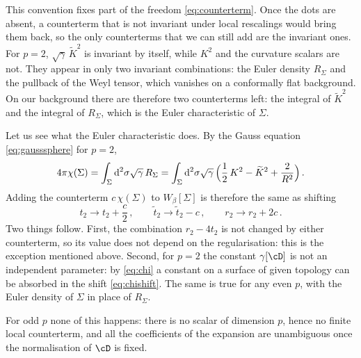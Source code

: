 \documentclass[a4paper,11pt]{article}
\newcommand{\Kt}{\widetilde{K}}
\newcommand{\dd}{\mathrm{d}}
\begin{document}
This convention fixes part of the freedom \eqref{eq:counterterm}. Once the dots are absent, a counterterm that is not invariant under local rescalings would bring them back, so the only counterterms that we can still add are the invariant ones. For $p=2$, $\sqrt\gamma\,\Kt^2$ is invariant by itself, while $K^2$ and the curvature scalars are not. They appear in only two invariant combinations: the Euler density $R_\Sigma$ and the pullback of the Weyl tensor, which vanishes on a conformally flat background. On our background there are therefore two counterterms left: the integral of $\Kt^2$ and the integral of $R_\Sigma$, which is the Euler characteristic of $\Sigma$.
	
	Let us see what the Euler characteristic does. By the Gauss equation \eqref{eq:gausssphere} for $p=2$,
	\begin{equation}\label{eq:chi}
		4\pi\chi(\Sigma)=\int_\Sigma\dd^2\sigma\sqrt\gamma\,R_\Sigma=\int_\Sigma\dd^2\sigma\sqrt\gamma\,\Bigl(\frac12\,K^2-\Kt^2+\frac{2}{R^2}\Bigr)\, .
	\end{equation}
	Adding the counterterm $c\,\chi(\Sigma)$ to $W_\beta[\Sigma]$ is therefore the same as shifting
	\begin{equation}\label{eq:chishift}
		t_2\to t_2+\frac c2\, ,\qquad \tilde t_2\to\tilde t_2-c\, ,\qquad r_2\to r_2+2c\, .
	\end{equation}
Two things follow. First, the combination $r_2-4t_2$ is not changed by either counterterm, so its value does not depend on the regularisation: this is the exception mentioned above. Second, for $p=2$ the constant $\gamma[\cD]$ is not an independent parameter: by \eqref{eq:chi} a constant on a surface of given topology can be absorbed in the shift \eqref{eq:chishift}. The same is true for any even $p$, with the Euler density of $\Sigma$ in place of $R_\Sigma$.

For odd $p$ none of this happens: there is no scalar of dimension $p$, hence no finite local counterterm, and all the coefficients of the expansion are unambiguous once the normalisation of $\cD$ is fixed.
\end{document}
